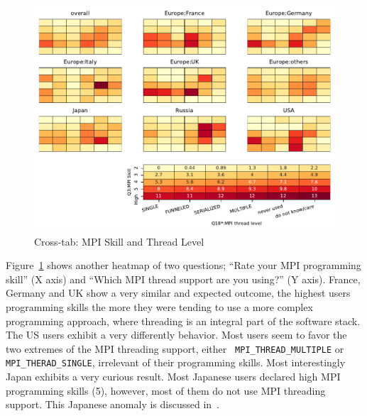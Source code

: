 \documentclass[sigconf,nonacm]{acmart}
\begin{document}
\begin{figure}[htb]
\begin{center}
\includegraphics[width=0.8\hsize]{figs/Q3-Q18.pdf}
\caption{Cross-tab: MPI Skill and Thread Level}%
\label{fig:Q3-Q18}
\end{center}
\end{figure}

Figure~\ref{fig:Q3-Q18} shows another heatmap of two questions; ``Rate
your MPI programming skill'' (X axis) and ``Which MPI thread support
are you using?'' (Y axis).
%
France, Germany and UK show a very similar and expected outcome, the
highest users programming skills the more they were tending to use a
more complex programming approach, where threading is an integral part
of the software stack.
The US users exhibit a very differently behavior. Most users seem to
favor the two extremes of the MPI threading support, either {\tt
  MPI\_THREAD\_MULTIPLE} or {\tt MPI\_THERAD\_SINGLE}, irrelevant of their
programming skills.
%
%
Most interestingly Japan exhibits a very
curious result. Most Japanese users declared high MPI programming skills (5),
however, most of them do not use MPI threading support. This Japanese
anomaly is discussed in~\cite{swopp2019}.
\end{document}

